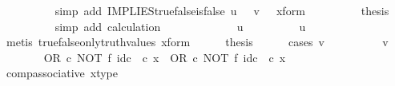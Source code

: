 \begin{isabellebody}
\ \ \ \ \ \ \ \ \isamarkupfalse%
\ {\isacharparenleft}{\kern0pt}simp\ add{\isacharcolon}{\kern0pt}\ IMPLIES{\isacharunderscore}{\kern0pt}true{\isacharunderscore}{\kern0pt}false{\isacharunderscore}{\kern0pt}is{\isacharunderscore}{\kern0pt}false\ {\isacartoucheopen}u\ {\isacharequal}{\kern0pt}\ {\isasymt}{\isacartoucheclose}\ {\isacartoucheopen}v\ {\isacharequal}{\kern0pt}\ {\isasymf}{\isacartoucheclose}\ x{\isacharunderscore}{\kern0pt}form{\isacharparenright}{\kern0pt}\isanewline
\ \ \ \ \ \ \isamarkupfalse%
\ \isamarkupfalse%
\ {\isacharquery}{\kern0pt}thesis\isanewline
\ \ \ \ \ \ \ \ \isamarkupfalse%
\ {\isacharparenleft}{\kern0pt}simp\ add{\isacharcolon}{\kern0pt}\ calculation{\isacharparenright}{\kern0pt}\isanewline
\ \ \ \ \isamarkupfalse%
\isanewline
\ \ \isamarkupfalse%
\isanewline
\ \ \ \ \isamarkupfalse%
\ {\isachardoublequoteopen}u\ {\isasymnoteq}\ {\isasymt}{\isachardoublequoteclose}\isanewline
\ \ \ \ \isamarkupfalse%
\ \isamarkupfalse%
\ {\isachardoublequoteopen}u\ {\isacharequal}{\kern0pt}\ {\isasymf}{\isachardoublequoteclose}\isanewline
\ \ \ \ \ \ \ \ \isamarkupfalse%
\ {\isacharparenleft}{\kern0pt}metis\ true{\isacharunderscore}{\kern0pt}false{\isacharunderscore}{\kern0pt}only{\isacharunderscore}{\kern0pt}truth{\isacharunderscore}{\kern0pt}values\ x{\isacharunderscore}{\kern0pt}form{\isacharparenright}{\kern0pt}\isanewline
\ \ \ \ \isamarkupfalse%
\ {\isacharquery}{\kern0pt}thesis\ \isanewline
\ \ \ \ \isamarkupfalse%
{\isacharparenleft}{\kern0pt}cases\ {\isachardoublequoteopen}v\ {\isacharequal}{\kern0pt}\ {\isasymt}{\isachardoublequoteclose}{\isacharparenright}{\kern0pt}\isanewline
\ \ \ \ \ \ \isamarkupfalse%
\ {\isachardoublequoteopen}v\ {\isacharequal}{\kern0pt}\ {\isasymt}{\isachardoublequoteclose}\isanewline
\ \ \ \ \ \ \isamarkupfalse%
\ {\isachardoublequoteopen}{\isacharparenleft}{\kern0pt}OR\ {\isasymcirc}\isactrlsub c\ NOT\ {\isasymtimes}\isactrlsub f\ id\isactrlsub c\ {\isasymOmega}{\isacharparenright}{\kern0pt}\ {\isasymcirc}\isactrlsub c\ x\ {\isacharequal}{\kern0pt}\ OR\ {\isasymcirc}\isactrlsub c\ {\isacharparenleft}{\kern0pt}NOT\ {\isasymtimes}\isactrlsub f\ id\isactrlsub c\ {\isasymOmega}{\isacharparenright}{\kern0pt}\ {\isasymcirc}\isactrlsub c\ x{\isachardoublequoteclose}\isanewline
\ \ \ \ \ \ \ \ \isamarkupfalse%
\ comp{\isacharunderscore}{\kern0pt}associative{}\ x{\isacharunderscore}{\kern0pt}type\ \isamarkupfalse%

\end{isabellebody}
